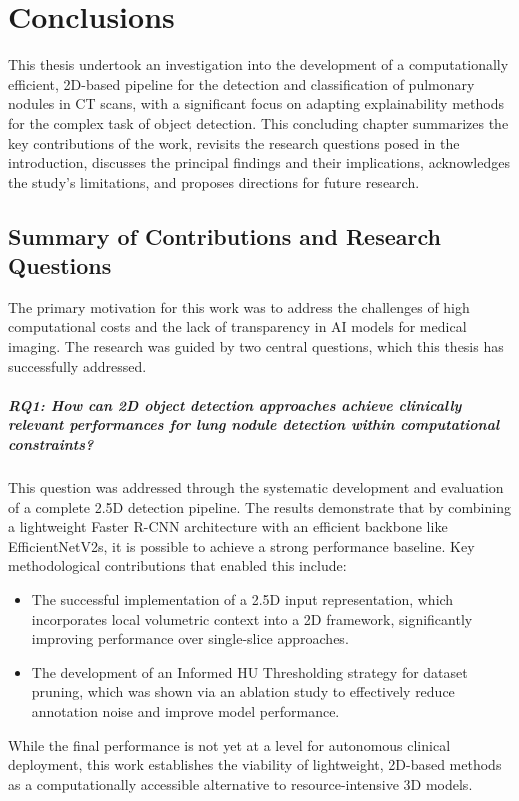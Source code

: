\chapter{Conclusions}

This thesis undertook an investigation into the development of a computationally efficient, 2D-based pipeline for the detection and classification of pulmonary nodules in CT scans, with a significant focus on adapting explainability methods for the complex task of object detection. This concluding chapter summarizes the key contributions of the work, revisits the research questions posed in the introduction, discusses the principal findings and their implications, acknowledges the study's limitations, and proposes directions for future research.

\section{Summary of Contributions and Research Questions}
\label{sec:summary_contributions}

The primary motivation for this work was to address the challenges of high computational costs and the lack of transparency in AI models for medical imaging. The research was guided by two central questions, which this thesis has successfully addressed.

\paragraph{RQ1: How can 2D object detection approaches achieve clinically relevant performances for lung nodule detection within computational constraints?}
This question was addressed through the systematic development and evaluation of a complete 2.5D detection pipeline. The results demonstrate that by combining a lightweight Faster R-CNN architecture with an efficient backbone like EfficientNetV2s, it is possible to achieve a strong performance baseline. Key methodological contributions that enabled this include:
\begin{itemize}
    \item The successful implementation of a 2.5D input representation, which incorporates local volumetric context into a 2D framework, significantly improving performance over single-slice approaches.
    \item The development of an Informed HU Thresholding strategy for dataset pruning, which was shown via an ablation study to effectively reduce annotation noise and improve model performance.
\end{itemize}
While the final performance is not yet at a level for autonomous clinical deployment, this work establishes the viability of lightweight, 2D-based methods as a computationally accessible alternative to resource-intensive 3D models.

